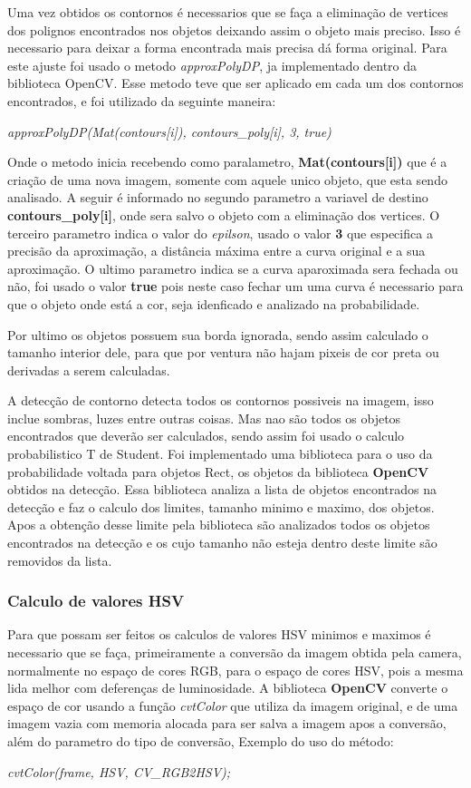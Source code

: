 Uma vez obtidos os contornos é necessarios que se faça a eliminação de vertices dos polignos encontrados nos objetos deixando assim o objeto mais preciso. Isso é necessario para deixar a forma encontrada mais precisa dá forma original. Para este ajuste foi usado o metodo \textit{approxPolyDP}, ja implementado dentro da biblioteca OpenCV. Esse metodo teve que ser aplicado em cada um dos contornos encontrados, e foi utilizado da seguinte maneira:
\begin{center}
\centering \textit{    approxPolyDP(Mat(contours[i]), contours\_poly[i], 3, true)}
\end{center}
 Onde o metodo inicia recebendo como paralametro, \textbf{Mat(contours[i])} que é a criação de uma nova imagem, somente com aquele unico objeto, que esta sendo analisado. A seguir é informado no segundo parametro a variavel de destino \textbf{contours\_poly[i]}, onde sera salvo o objeto com a eliminação dos vertices. O terceiro parametro indica o valor do \textit{epilson}, usado o valor \textbf{3} que especifica a precisão da aproximação, a distância máxima entre a curva original e a sua aproximação\cite{OpenCV}. O ultimo parametro indica se a curva aparoximada sera fechada ou não, foi usado o valor \textbf{true} pois neste caso fechar um uma curva é necessario para que o objeto onde está a cor, seja idenficado e analizado na probabilidade.
 
 Por ultimo os objetos possuem sua borda ignorada, sendo assim calculado o tamanho interior dele, para que por ventura não hajam pixeis de cor preta ou derivadas a serem calculadas.
 
 A detecção de contorno detecta todos os contornos possiveis na imagem, isso inclue sombras, luzes entre outras coisas. Mas nao são todos os objetos encontrados que deverão ser calculados, sendo assim foi usado o calculo probabilistico T de Student.
 Foi implementado uma biblioteca para o uso da probabilidade voltada para objetos Rect, os objetos da biblioteca \textbf{OpenCV} obtidos na detecção. Essa biblioteca analiza a lista de objetos encontrados na detecção e faz o calculo dos limites, tamanho minimo e maximo, dos objetos. Apos a obtenção desse limite pela biblioteca são analizados todos os objetos encontrados na detecção e os cujo tamanho não esteja dentro deste limite são removidos da lista.
 
 \subsubsection{Calculo de valores HSV}
 Para que possam ser feitos os calculos de valores HSV minimos e maximos é necessario que se faça, primeiramente a conversão da imagem obtida pela camera, normalmente no espaço de cores RGB, para o espaço de cores HSV, pois a mesma lida melhor com deferenças de luminosidade. 
 A biblioteca \textbf{OpenCV} converte o espaço de cor usando a função \textit{cvtColor} que utiliza da imagem original, e de uma imagem vazia com memoria alocada para ser salva a imagem apos a conversão, além do parametro do tipo de conversão, Exemplo do uso do método:
\begin{center}
\centering \textit{cvtColor(frame, HSV, CV\_RGB2HSV);}
\end{center}


